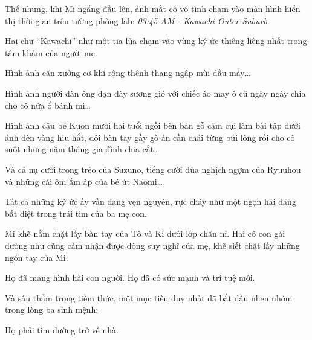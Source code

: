 \documentclass[../main.tex]{subfiles}
\begin{document}
Thế nhưng, khi Mi ngẩng đầu lên, ánh mắt cô vô tình chạm vào màn hình hiển thị thời gian trên tường phòng lab: \textit{03:45 AM - Kawachi Outer Suburb}.

Hai chữ ``Kawachi'' như một tia lửa chạm vào vùng ký ức thiêng liêng nhất trong tâm khảm của người mẹ.

Hình ảnh căn xưởng cơ khí rộng thênh thang ngập mùi dầu máy\dots\

Hình ảnh người đàn ông dạn dày sương gió với chiếc áo may ô cũ ngày ngày chia cho cô nửa ổ bánh mì\dots\

Hình ảnh cậu bé Kuon mười hai tuổi ngồi bên bàn gỗ cặm cụi làm bài tập dưới ánh đèn vàng hiu hắt, đôi bàn tay gầy gò ân cần chải từng búi lông rối cho cô suốt những năm tháng gia đình chia cắt\dots\

Và cả nụ cười trong trẻo của Suzuno, tiếng cười đùa nghịch ngợm của Ryuuhou và những cái ôm ấm áp của bé út Naomi\dots\

Tất cả những ký ức ấy vẫn đang vẹn nguyên, rực cháy như một ngọn hải đăng bất diệt trong trái tim của ba mẹ con.

Mi khẽ nắm chặt lấy bàn tay của Tô và Ki dưới lớp chăn nỉ. Hai cô con gái dường như cũng cảm nhận được dòng suy nghĩ của mẹ, khẽ siết chặt lấy những ngón tay của Mi.

Họ đã mang hình hài con người. Họ đã có sức mạnh và trí tuệ mới.

Và sâu thẳm trong tiềm thức, một mục tiêu duy nhất đã bắt đầu nhen nhóm trong lòng ba sinh mệnh:

Họ phải tìm đường trở về nhà.
\end{document}
